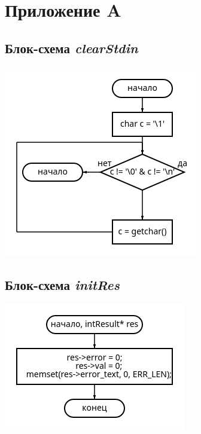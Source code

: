 \documentclass[a4paper, 12pt]{article}
\begin{document}
\cleardoublepage

\section*{Приложение A}
\renewcommand\thesection{\Alph{section}}
\renewcommand\thesubsection{\thesection.\arabic{subsection}}
\setcounter{subsection}{0}

\subsection{Блок-схема \textit{clearStdin}}
\includegraphics[width=\columnwidth]{clearStdin.png}

\subsection{Блок-схема \textit{initRes}}
\includegraphics[width=\columnwidth]{initRes.png}
\end{document}
